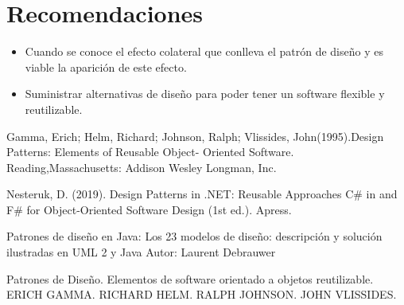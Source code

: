 \documentclass[twoside,twocolumn]{article}
\begin{document}
\section{Recomendaciones}


\begin{itemize}
\item Cuando se conoce el efecto colateral que conlleva el patrón de diseño y es viable la aparición de este efecto.
\item Suministrar alternativas de diseño para poder tener un software flexible y reutilizable.

\end{itemize}




\begin{thebibliography}{99} 

\bibitem[1]{}
\newblock Gamma, Erich; Helm, Richard; Johnson, Ralph; Vlissides, John(1995).Design Patterns: Elements of Reusable Object- Oriented Software. Reading,Massachusetts: Addison Wesley Longman, Inc.

\bibitem[2]{}
\newblock Nesteruk, D. (2019). Design Patterns in .NET: Reusable Approaches C\# in and F\# for Object-Oriented Software Design (1st ed.). Apress.

\bibitem[3]{}
\newblock Patrones de diseño en Java: Los 23 modelos de diseño: descripción y solución ilustradas en UML 2 y Java Autor: Laurent Debrauwer

\bibitem[4]{}
\newblock Patrones de Diseño. Elementos de software orientado a objetos reutilizable. ERICH GAMMA. RICHARD HELM. RALPH JOHNSON. JOHN VLISSIDES.

\end{thebibliography}


\end{document}
